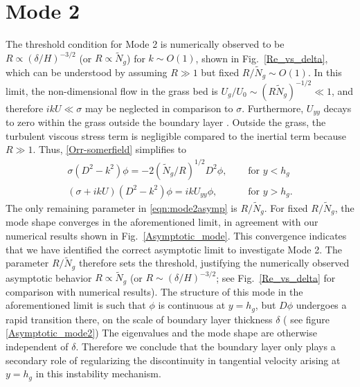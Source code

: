 \documentclass[12pt]{report}   %
\newcommand{\hg}{h_g}
\newcommand{\Rey}{{R}}
\newcommand{\Ndg}{\tilde{N}_g}
\begin{document}
\section{Mode 2}
The threshold condition for Mode 2 is numerically observed to be $\Rey \propto ({\delta}/{H})^{-3/2}$ (or $\Rey \propto \Ndg$) for $k\sim O(1)$, shown in Fig.~\ref{Re_vs_delta}, which can be understood by assuming $\Rey \gg 1$ but fixed $\Rey/\Ndg \sim O(1)$.
In this limit, the non-dimensional flow in the grass bed is $U_g/U_0 \sim (\Rey \Ndg)^{-1/2} \ll 1$, and therefore $ikU \ll \sigma$ may be neglected in comparison to $\sigma$. 
Furthermore, $U_{yy}$ decays to zero within the grass outside the boundary layer . 
Outside the grass, the turbulent viscous stress term is negligible compared to the inertial term because $\Rey \gg 1$. 
Thus, \eqref{Orr-somerfield} simplifies to 
\begin{subequations}
\begin{align}
\sigma\left(D^2-k^2\right)\phi = -2{(\Ndg/\Rey)^{1/2}}D^2\phi,  \quad &\text{ for } y<\hg  \label{eqn:mode2asympa} \\
\left(\sigma+ikU\right) \left(D^2-k^2\right)\phi =  ikU_{yy}\phi, \quad &\text{ for } y>\hg. \label{eqn:mode2asympb}
\end{align}
\label{eqn:mode2asymp}
\end{subequations}
The only remaining parameter in \eqref{eqn:mode2asymp} is $\Rey/\Ndg$. 
For fixed $\Rey/\Ndg$, the mode shape converges in the aforementioned limit, in agreement with our numerical results shown in Fig.~\ref{Asymptotic_mode}.
This convergence indicates that we have identified the correct asymptotic limit to investigate Mode 2.
The parameter $\Rey/\Ndg$ therefore sets the threshold, justifying the numerically observed asymptotic behavior $\Rey \propto \Ndg$ (or $\Rey \sim ({\delta}/{H})^{-3/2}$; see Fig.~\ref{Re_vs_delta} for comparison with numerical results).
The structure of this mode in the aforementioned limit is such that $\phi$ is continuous at $y=h_g$, but $D\phi$ undergoes a rapid transition there, on the scale of boundary layer thickness $\delta$ ( see figure \ref{Asymptotic_mode2})
The eigenvalues and the mode shape are otherwise independent of $\delta$.
Therefore we conclude that the boundary layer only plays a secondary role of regularizing the discontinuity in tangential velocity arising at $y=\hg$ in this instability mechanism.
\end{document}
